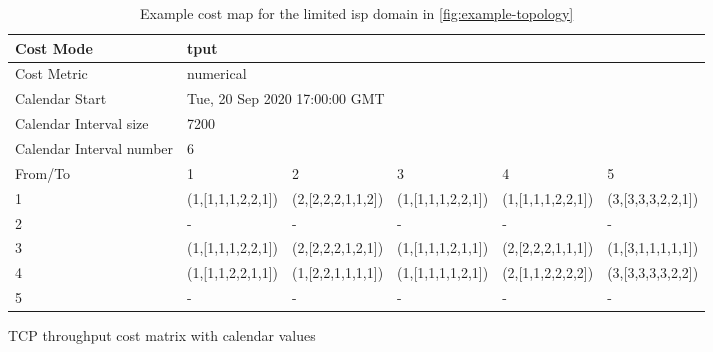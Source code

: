 \begin{table}
\begin{subtable}{1\linewidth}
        \footnotesize
        \centering
        \hspace*{-2em}
        \begin{tabular}{|l|l|l|l|l|l|}
        \hline
        Cost Mode                & \multicolumn{5}{|l|}{tput}                            \\ \hline
        Cost Metric              & \multicolumn{5}{|l|}{numerical}                       \\ \hline
        Calendar Start           & \multicolumn{5}{|l|}{Tue, 20 Sep 2020 17:00:00 GMT}   \\ \hline
        Calendar Interval size   & \multicolumn{5}{|l|}{7200}                            \\ \hline
        Calendar Interval number & \multicolumn{5}{|l|}{6}                               \\ \hline
        From/To                  & 1                    & 2                     & 3                        & 4                   & 5                  \\ \hline
        1                        & (1,[1,1,1,2,2,1])    & (2,[2,2,2,1,1,2])     & (1,[1,1,1,2,2,1])        & (1,[1,1,1,2,2,1])   & (3,[3,3,3,2,2,1])  \\ \hline
        2                        & -                    & -                     & -                        & -                   & -                  \\ \hline
        3                        & (1,[1,1,1,2,2,1])    & (2,[2,2,2,1,2,1])     & (1,[1,1,1,2,1,1])        & (2,[2,2,2,1,1,1])   & (1,[3,1,1,1,1,1])  \\ \hline
        4                        & (1,[1,1,2,2,1,1])    & (1,[2,2,1,1,1,1])     & (1,[1,1,1,1,2,1])        & (2,[1,1,2,2,2,2])   & (3,[3,3,3,3,2,2])  \\ \hline
        5                        & -                    & -                     & -                        & -                   & -                  \\ \hline
        \end{tabular}
    \caption{TCP throughput cost matrix with calendar values}
    \end{subtable}

    \caption{Example cost map for the limited \gls{isp} domain in \ref{fig:example-topology}}
    \label{table:costmap-example-boundary}
\end{table}

    \newpage

